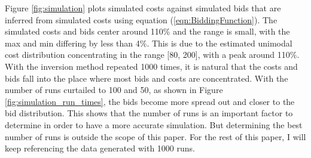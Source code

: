 \documentclass[11pt]{article}
\begin{document}
Figure \ref{fig:simulation} plots simulated costs against simulated bids that are 
inferred from simulated costs using equation (\ref{eqn:BiddingFunction}). 
The simulated costs and bids center around 110\% 
and the range is small, with the max and min differing by less than 4\%. This 
is due to the estimated unimodal cost distribution 
concentrating in the range [80, 200], with a peak around 110\%. 
With the inversion method repeated 1000 times, it is natural that 
the costs and bids fall into the place where most bids and costs are 
concentrated. With the number of runs curtailed to 100 and 50, as shown in 
Figure \ref{fig:simulation_run_times}, the bids become more spread out and 
closer to the bid distribution. This shows that the number of runs is 
an important factor to determine in order to have a more accurate simulation.
But determining the best number of runs is outside the scope of this paper.  
For the rest of this paper, I will keep 
referencing the data generated with 1000 runs. 
\end{document}
